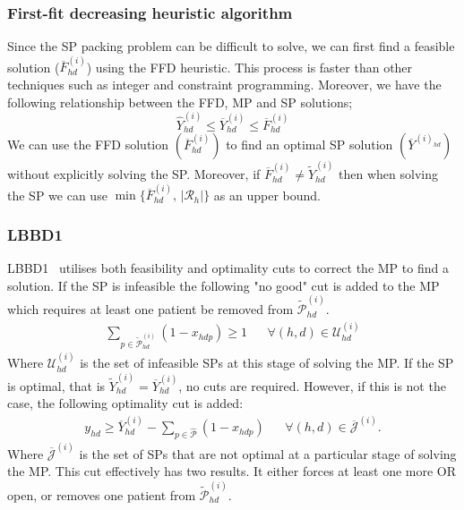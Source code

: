 \subsubsection*{First-fit decreasing heuristic algorithm}
Since the SP packing problem can be difficult to solve, we can first find a feasible solution 
($\overline{F}^{(i)}_{hd}$) using the FFD heuristic. This process is faster than other techniques
such as integer and constraint programming. Moreover, we have the following relationship 
between the FFD, MP and SP solutions;
\begin{equation}
    \hat{Y}^{(i)}_{hd} \leq \overline{Y}^{(i)}_{hd} \leq \overline{F}^{(i)}_{hd}
\end{equation}
We can use the FFD solution $\left(\overline{F}^{(i)}_{hd}\right)$ to find an optimal SP solution 
$\left(\overline{Y}^{(i)_{hd}}\right)$ without explicitly solving the SP. Moreover, if 
$\overline{F}^{(i)}_{hd} \neq \tilde{Y}^{(i)}_{hd}$ then when solving the SP we can use 
$\operatorname{min}\{\overline{F}^{(i)}_{hd},\, |\mathcal{R}_h|\}$ as an upper bound. 

\subsubsection{LBBD1}
LBBD1~\cite{roshanaei2017propagating} utilises both feasibility and optimality cuts to 
correct the MP to find a solution. If the SP is infeasible the following "no good" cut 
is added to the MP which requires at least one patient be removed from 
$\tilde{\mathcal{P}}^{(i)}_{hd}$.
\begin{align}
    \sum\limits_{p \in \tilde{\mathcal{P}}^{(i)}_{hd}}(1-x_{hdp})\geq 1 
        && \forall (h,d) \in \mathcal{U}_{hd}^{(i)}
\end{align}
Where $\mathcal{U}_{hd}^{(i)}$ is the set of infeasible SPs at this stage of solving the MP.
If the SP is optimal, that is $\tilde{Y}^{(i)}_{hd} = \overline{Y}^{(i)}_{hd}$, no cuts
are required. However, if this is not the case, the following optimality cut is added:
\begin{align*}
    y_{hd} \geq \overline{Y}_{hd}^{(i)} - \sum\limits_{p \in \hat{\mathcal{P}}}(1-x_{hdp}) && \forall (h,d) \in \overline{\mathcal{J}}^{(i)}.
\end{align*}
Where $\overline{\mathcal{J}}^{(i)}$ is the set of SPs that are not optimal at a particular stage of solving the MP. This cut effectively has two results. It either forces at least one more OR open, or removes one patient from $\tilde{\mathcal{P}}^{(i)}_{hd}$.
